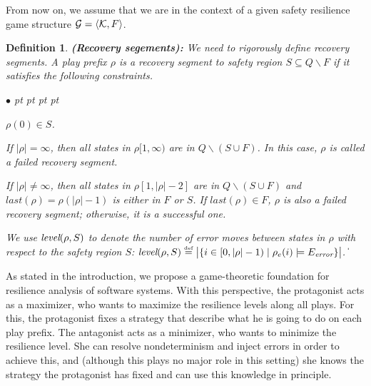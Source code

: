 \documentclass[times,10pt,twocolumn]{article}
\newtheorem{definition}{Definition}
\newcommand\qed{\hfill\ensuremath{\Box}}
\newcommand{\emerr}{\textit{error}}
\newcommand{\emlast}{\textit{last}}
\newcommand{\defn}{\stackrel{\mbox{\tiny def}}{=}}
\newcommand{\calg}{{\cal G}}
\newcommand{\calk}{{\cal K}}
\def\qed{\ifmmode\|\else{\unskip\nobreak\hfil
\penalty50\hskip1em\null\nobreak\hfil$\blacksquare$
\parfillskip=0pt\finalhyphendemerits=0\endgraf}\fi}
\newenvironment{list1}{\begin{list}{$\bullet$}
{\topsep 0 pt \parsep 0 pt \partopsep 0 pt \itemsep 0
pt}}{\end{list}}
\begin{document}
From now on, we assume that we are in the context of a 
given safety resilience game structure $\calg=\langle \calk,F\rangle$. 

\begin{definition}\label{def.rec.seg}
{\bf (Recovery segements):} 
We need to rigorously define {\em recovery segments}. 
A play prefix $\rho$ is a {\em recovery segment} to safety region $S\subseteq Q\smallsetminus F$ 
if it satisfies the following constraints. 
\begin{list1} 
\item %
      $\rho(0)\in S$. 
\item If $|\rho|=\infty$, then all states in $\rho[1,\infty)$ are 
  in $Q\smallsetminus(S\cup F)$. 
  In this case, $\rho$ is called a failed recovery segment. 
\item If $|\rho|\neq \infty$, then all states in $\rho[1,|\rho|-2]$ 
  are in $Q\smallsetminus(S\cup F)$ and 
  $\emlast(\rho)=\rho(|\rho|-1)$ is either in $F$ or $S$.    
  If $\emlast(\rho)\in F$, $\rho$ is also a failed recovery segment; 
  otherwise, it is a successful one. 
\end{list1} 
We use $\mbox{\em level}(\rho, S)$ to 
denote the number of error moves between states in $\rho$  
with respect to the safety region $S$:
$\mbox{\em level}(\rho, S) \defn \big\lvert\{i \in [0,|\rho|-1) \mid \rho_e(i) \models E_{\emerr}\}\big\rvert$.
\qed 
\end{definition} 

As stated in the introduction, we propose 
a game-theoretic foundation for resilience analysis of software systems. 
With this perspective, the protagonist acts as a maximizer, who wants to maximize the 
resilience levels along all plays.
For this, the protagonist fixes a strategy that describe what he is going to do on each play prefix.
The antagonist acts as a minimizer, who wants to minimize the resilience level.
She can resolve nondeterminism and inject errors in order to achieve this, and (although this plays no major role in this setting) she knows the strategy the protagonist has fixed and can use this knowledge in principle.
\end{document}
